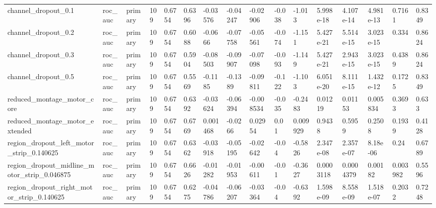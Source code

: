 \begin{tabular}{llllllllllllllll}
channel\_dropout\_0.1 & roc\_auc & primary & 109 & 0.6754 & 0.6396 & -0.03576 & -0.04247 & -0.02906 & -0.038 & -1.013 & 5.998e-18 & 4.107e-14 & 4.981e-13 & 0.7161 & 0.8349 \\
channel\_dropout\_0.2 & roc\_auc & primary & 109 & 0.6754 & 0.6088 & -0.0666 & -0.07758 & -0.05561 & -0.074 & -1.151 & 5.427e-21 & 5.514e-15 & 3.023e-15 & 0.334 & 0.8624 \\
channel\_dropout\_0.3 & roc\_auc & primary & 109 & 0.6754 & 0.5904 & -0.08503 & -0.09907 & -0.07098 & -0.093 & -1.149 & 5.427e-21 & 2.943e-15 & 3.023e-15 & 0.4389 & 0.8624 \\
channel\_dropout\_0.5 & roc\_auc & primary & 109 & 0.6754 & 0.5569 & -0.1185 & -0.1389 & -0.09811 & -0.122 & -1.103 & 6.051e-20 & 8.111e-15 & 1.432e-12 & 0.1725 & 0.8349 \\
reduced\_montage\_motor\_core & roc\_auc & primary & 109 & 0.6754 & 0.6392 & -0.03624 & -0.06394 & -0.008534 & -0.035 & -0.2483 & 0.01219 & 0.01153 & 0.005834 & 0.3693 & 0.633 \\
reduced\_montage\_motor\_extended & roc\_auc & primary & 109 & 0.6754 & 0.6769 & 0.001468 & -0.0266 & 0.02954 & 0.01 & 0.009929 & 0.9438 & 0.5959 & 0.2508 & 0.1939 & 0.4128 \\
region\_dropout\_left\_motor\_strip\_0.140625 & roc\_auc & primary & 109 & 0.6754 & 0.6362 & -0.03918 & -0.05195 & -0.02642 & -0.04 & -0.5826 & 2.347e-08 & 2.357e-07 & 8.18e-06 & 0.24 & 0.6789 \\
region\_dropout\_midline\_motor\_strip\_0.046875 & roc\_auc & primary & 109 & 0.6754 & 0.6626 & -0.01282 & -0.01953 & -0.00611 & -0.01 & -0.3627 & 0.0003118 & 0.0004379 & 0.00182 & 0.003982 & 0.5596 \\
region\_dropout\_right\_motor\_strip\_0.140625 & roc\_auc & primary & 109 & 0.6754 & 0.6275 & -0.04786 & -0.06207 & -0.03364 & -0.04 & -0.6392 & 1.598e-09 & 8.558e-09 & 1.518e-07 & 0.2032 & 0.7248 \\
\bottomrule
\end{tabular}
